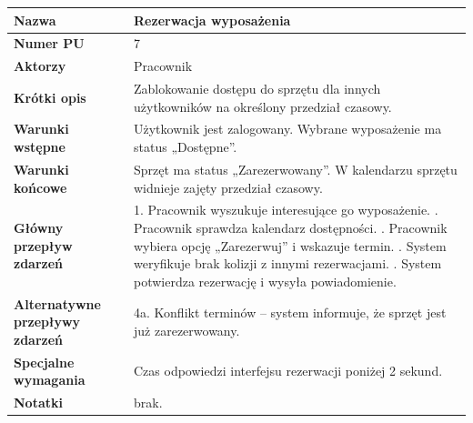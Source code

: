 \documentclass{article}
\begin{document}
    \begin{tabular}{|m{10em}|m{30em}|}
        \hline
        \textbf{Nazwa} & Rezerwacja wyposażenia \\
        \hline
        \textbf{Numer PU} & 7 \\
        \hline
        \textbf{Aktorzy} & Pracownik \\
        \hline
        \textbf{Krótki opis} & Zablokowanie dostępu do sprzętu dla innych użytkowników na określony przedział czasowy. \\
        \hline
        \textbf{Warunki wstępne} & Użytkownik jest zalogowany. Wybrane wyposażenie ma status „Dostępne”. \\
        \hline
        \textbf{Warunki końcowe} & Sprzęt ma status „Zarezerwowany”. W kalendarzu sprzętu widnieje zajęty przedział czasowy. \\
        \hline
        \textbf{Główny przepływ zdarzeń} & 
            1. Pracownik wyszukuje interesujące go wyposażenie. \newline
            2. Pracownik sprawdza kalendarz dostępności. \newline
            3. Pracownik wybiera opcję „Zarezerwuj” i wskazuje termin. \newline
            4. System weryfikuje brak kolizji z innymi rezerwacjami. \newline
            5. System potwierdza rezerwację i wysyła powiadomienie. \\
        \hline
        \textbf{Alternatywne przepływy zdarzeń} & 
            4a. Konflikt terminów – system informuje, że sprzęt jest już zarezerwowany. \\
        \hline
        \textbf{Specjalne wymagania} & Czas odpowiedzi interfejsu rezerwacji poniżej 2 sekund. \\
        \hline
        \textbf{Notatki} & brak. \\
        \hline
    \end{tabular}

    \vspace{1cm}
\end{document}
